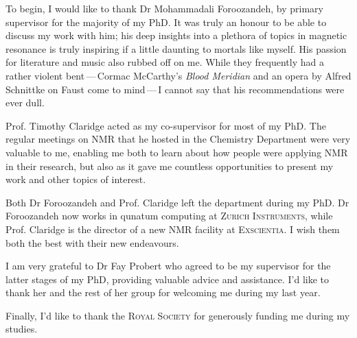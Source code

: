 \begin{acknowledgements}
    To begin, I would like to thank Dr Mohammadali Foroozandeh, by primary
    supervisor for the majority of my PhD. It was truly an honour to be able to
    discuss my work with him; his deep insights into a plethora of
    topics in magnetic resonance is truly inspiring if a little daunting to
    mortals like myself.
    His passion for literature and music also rubbed off
    on me. While they frequently had a rather violent
    bent\,---\,Cormac McCarthy's \emph{Blood Meridian} and an opera by Alfred
    Schnittke on Faust come to mind\,---\,I cannot say that his recommendations
    were ever dull.

    Prof. Timothy Claridge acted as my co-supervisor for most of my PhD. The
    regular meetings on NMR that he hosted in the Chemistry Department were
    very valuable to me, enabling me both to learn about how people were
    applying NMR in their research, but also as it gave me countless
    opportunities to present my work and other topics of interest.

    Both Dr Foroozandeh and Prof. Claridge left the department during my PhD.
    Dr Foroozandeh now works in qunatum computing at \textsc{Zurich
    Instruments}, while Prof. Claridge is the director of a new NMR facility at
    \textsc{Exscientia}. I wish them both the best with their new endeavours.

    I am very grateful to Dr Fay Probert who agreed to be my supervisor for
    the latter stages of my PhD, providing valuable advice and assistance. I'd
    like to thank her and the rest of her group for welcoming me during my last
    year.

    Finally, I'd like to thank the \textsc{Royal Society} for generously
    funding me during my studies.
\end{acknowledgements}
